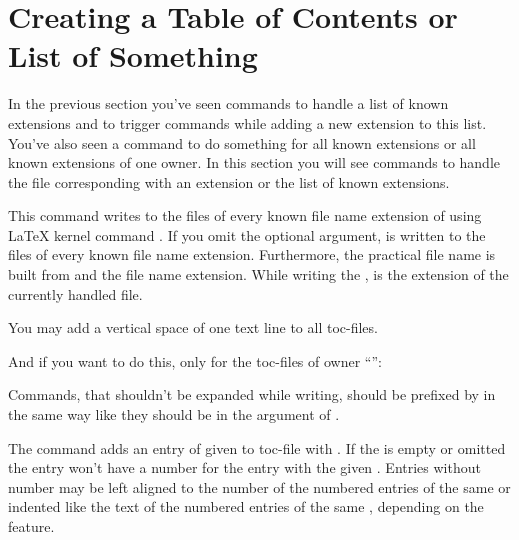 \section{Creating a Table of Contents or List of Something}
\label{sec:tocbasic.toc}

In the previous section you've seen commands to handle a list of known
extensions and to trigger commands while adding a new extension to this
list. You've also seen a command to do something for all known extensions or
all known extensions of one owner. In this section you will see commands to
handle the file corresponding with an extension or the list of known
extensions.

\begin{Declaration}
\end{Declaration}
%
This command writes  to the files of every known file name
extension of  using \LaTeX{} kernel command
. If you omit the optional argument,  is
written to the files of every known file name extension. Furthermore, the
practical file name is built from  and the file name
extension. While writing the ,
 is the
extension of the currently handled file.
\begin{Example}
  You may add a vertical space of one text line to all toc-files.
\begin{lstcode}
    \addtoeachtocfile{%
      \protect\addvspace{\protect\baselineskip}%
    }
\end{lstcode}
  And if you want to do this, only for the toc-files of owner
  ``'':
\begin{lstcode}
    \addtoeachtocfile[foo]{%
      \protect\addvspace{\protect\baselineskip}%
    }
\end{lstcode}
\end{Example}
Commands, that shouldn't be expanded while writing, should be prefixed by
 in the same way like they should be in the argument of
.
%

\begin{Declaration}
\end{Declaration}
%
The command 
adds an entry of given  to toc-file with . If
the  is empty or omitted the entry won't have a number for
the entry with the given . Entries without number may be left
aligned to the number of the numbered entries of the same  or
indented like the text of the numbered entries of the same ,
depending on the  feature.

